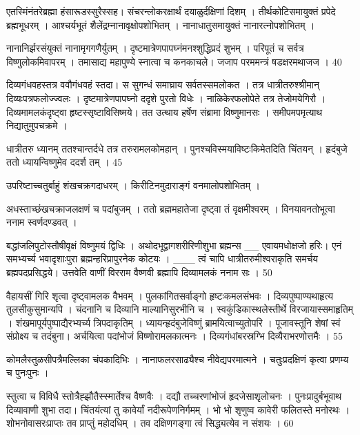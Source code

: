   एतस्मिंनंतरेब्रह्मा हंसारूडस्सुरैस्सह।
 संचरन्लोकरक्षार्थं दयाळुर्दक्षिणां दिशम् ।
 तीर्थकोटिसमायुक्तं प्रपेदे ब्रह्मभूधरम् ।
 आश्चर्यभूतं शैलेंद्रम्नानावृक्षोपशोभितम् ।
 नानाधातुसमायुक्तं नानारत्नोपशोभितम् ।
 
नानानिर्झरसंयुक्तं नानामृगगणैर्युतम् ।
 दृष्टमात्रेणपापघ्नंमनश्शुद्धिप्रदं शुभम् ।
 परिपूतं च सर्वत्र विष्णुलोकमिवापरम् ।
 तमासाद्य महापुण्ये स्नात्वा च कनकाचले।
 जजाप परममन्त्रं षडक्षरमथाजज ।
 40

  दिव्यगंधवहस्तत्र ववौगंधवहं स्तदा।
 स सुगन्धं समाघ्राय सर्वतस्समलोकत ।
 तत्र धात्रीतरुश्श्रीमान् दिव्यःपत्रफलोज्ज्वलः ।
 दृष्टमात्रेणपापघ्नो ददृशे पुरतो विधेः ।
 नाळिकेरफलोपेते तत्र तेजोमयेगिरौ ।
 दिव्यमामलकंदृष्ट्वा हृष्टस्सृष्टाविसिष्मये।
 तत उत्थाय हर्षेण संब्रामा विष्णुमानसः ।
 समीपमपमृत्याथ निद्यातुमुपचक्रमे ।
 
धात्रीतरु ध्यानम् ततश्चान्तर्दधे तत्र तरुरामलकोमहान् ।
 पुनश्चविस्मयाविष्टःकिमेतदिति चिंतयन् ।
 हृदंबुजे ततो ध्यायन्विष्णुमेव ददर्श तम् ।
 45

  उपरिष्टाच्चतुर्बाहुं शंखचक्रगदाधरम् ।
 किरीटिनमुदाराङ्गं वनमालोपशोभितम् ।
 
अधस्ताच्छंखचक्राजलक्षणं च पदांबुजम् ।
 ततो ब्रह्ममहातेजा दृष्ट्वा तं वृक्षमीश्वरम् ।
 विनयावनतोभूत्वा ननाम स्वर्णदण्डवत् ।
 
बद्धांजलिपुटोस्तौषीवृक्षं विष्णुमयं द्विधिः ।
 अथोदभूद्वागशरीरिणीशुभा ब्रह्मन्स
__ एवायमधोक्षजो हरिः।
 एनं समभ्यर्च्य भवादृशाःपुरा
ब्रह्मन्हरिप्रापुरनेक कोटयः ।
 ___ त्वं चापि धात्रीतरुमीश्वराकृति
समर्चय ब्रह्मपदप्रसिद्धये।
 उत्तवेति वाणीं विरराम वैष्णवी ब्रह्मापि
दिव्यामलकं ननाम सः ।
50

 वैहायसीं गिरि शृत्वा दृष्ट्वामलक वैभवम् ।
 पुलकांगितसर्वाङ्गो हृष्टःकमलसंभवः ।
 दिव्यपुष्पाण्यथाहृत्य तुलसीकुसुमान्यपि ।
 चंदनानि च दिव्यानि माल्यानिसुरभीनि च ।
 स्वकुंडिकास्थलेस्तीर्थे विरजायास्समाहृतिम् ।
 शंखमापूर्यपुष्पाद्यैरभ्यर्च्य त्रिपदाकृतिम् ।
 ध्यायन्हृदंबुजेविष्णुं ब्रामयित्वाच्युतोपरि ।
 पूजावस्तूनि शेषां स्वं संप्रोक्ष्य च तदंबुना।
 अर्चयित्वा पदांभोजं विष्णोरामलकात्मनः ।
 दिव्यगंधांबरस्रग्भि दिव्यैराभरणोत्तमैः ।
 55

  कोमलैस्तुळसीपत्रैमल्लिका चंपकादिभिः ।
 नानाफलरसाढ्यैश्च नीवेद्यपरमात्मने ।
 चतुःप्रदक्षिणं कृत्वा प्रणम्य च पुनःपुनः ।
 
स्तुत्वा च विविधै स्तोत्रैह्झौतैस्स्मार्तेश्च वैष्णवैः ।
 दद्यौ तच्चरणांभोजं हृदजेसाशृलोचनः ।
 पुनःप्रादुर्बभूवाथ दिव्यावाणी शुभा तदा।
 चिंतयंत्यां तु कावेर्यां नदीरूपेणनिर्गमम् ।
 भो भो शृणुष्व कावेरी फलितस्ते मनोरथः ।
 शोभनोवासरःप्राप्तः तव प्राप्तुं महोदधिम् ।
 तव दक्षिणगङ्गा त्वं सिद्ध्यत्येव न संशयः ।
 60


